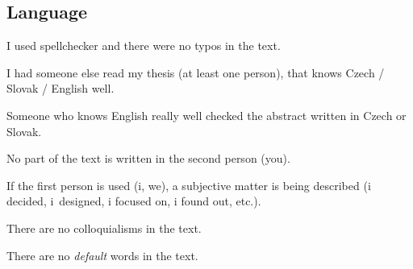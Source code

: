 \subsection*{Language}
\begin{checklist}
	\item I used spellchecker and there were no typos in the text.
    \item I had someone else read my thesis (at least one person), that knows Czech / Slovak / English well.
    \item Someone who knows English really well checked the abstract written in Czech or Slovak.
    \item No part of the text is written in the second person (you).
    \item If the first person is used (i, we), a subjective matter is being described (i decided, i~designed, i focused on, i found out, etc.).
    \item There are no colloquialisms in the text.
    \item There are no {\it default} words in the text.
\end{checklist}

